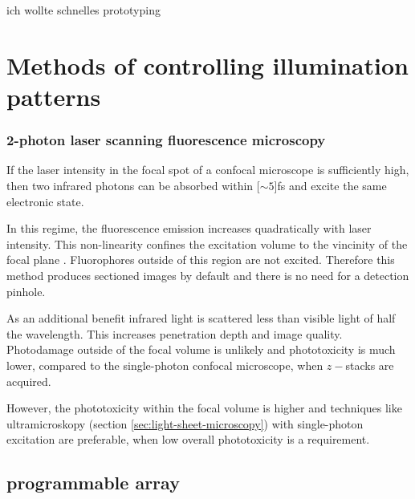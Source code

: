 \documentclass[oneside,a4paper,12pt,BCOR20mm,DIV14]{scrbook} %
\begin{document}
ich wollte schnelles prototyping




\chapter{Methods of controlling illumination patterns}
\label{sec:illum-patterns}
\subsection{2-photon laser scanning fluorescence microscopy}
\label{sec:2-photon}
If the laser intensity in the focal spot of a confocal microscope is
sufficiently high, then two infrared photons can be absorbed within
\unit[$\sim 5$]{fs} and excite the same electronic state.

In this regime, the fluorescence emission increases quadratically with
laser intensity. This non-linearity confines the excitation volume to
the vincinity of the focal plane \citep{Denk1990}. Fluorophores
outside of this region are not excited. Therefore this method produces
sectioned images by default and there is no need for a detection
pinhole.

As an additional benefit infrared light is scattered less than visible
light of half the wavelength. This increases penetration depth and
image quality. Photodamage outside of the focal volume is unlikely and
phototoxicity is much lower, compared to the single-photon confocal
microscope, when $z-$stacks are acquired.

However, the phototoxicity within the focal volume is higher and
techniques like ultramicroskopy (section
\ref{sec:light-sheet-microscopy}) with single-photon excitation are
preferable, when low overall phototoxicity is a requirement.

\section{programmable array}
\cite{Caarls2011}



%
%

\end{document}
